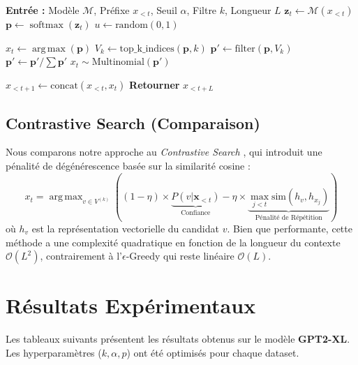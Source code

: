 \documentclass[12pt,a4paper]{article}
\DeclareMathOperator*{\argmax}{arg\,max}
\DeclareMathOperator*{\softmax}{softmax}
\begin{document}
\begin{algorithm}[H]
\caption{Génération $\epsilon$-Greedy}
\begin{algorithmic}[1]
\State \textbf{Entrée :} Modèle $\mathcal{M}$, Préfixe $x_{<t}$, Seuil $\alpha$, Filtre $k$, Longueur $L$
    \State $\mathbf{z}_t \leftarrow \mathcal{M}(x_{<t})$ 
    \State $\mathbf{p} \leftarrow \softmax(\mathbf{z}_t)$
    \State $u \leftarrow \text{random}(0, 1)$
    
     
        \State $x_t \leftarrow \argmax(\mathbf{p})$
    \Else {}
        \State $V_k \leftarrow \text{top\_k\_indices}(\mathbf{p}, k)$
        \State $\mathbf{p}' \leftarrow \text{filter}(\mathbf{p}, V_k)$ 
        \State $\mathbf{p}' \leftarrow \mathbf{p}' / \sum \mathbf{p}'$ 
        \State $x_t \sim \text{Multinomial}(\mathbf{p}')$
    \EndIf
    
    \State $x_{<t+1} \leftarrow \text{concat}(x_{<t}, x_t)$
\EndFor
\State \textbf{Retourner} $x_{<t+L}$
\end{algorithmic}
\end{algorithm}

\subsection{Contrastive Search (Comparaison)}
Nous comparons notre approche au \textit{Contrastive Search} \cite{su2022contrastive}, qui introduit une pénalité de dégénérescence basée sur la similarité cosine :
\begin{equation}
    x_t = \argmax_{v \in V^{(k)}} \left( (1 - \eta) \times \underbrace{P(v | \mathbf{x}_{<t})}_{\text{Confiance}} - \eta \times \underbrace{\max_{j < t} \text{sim}(h_v, h_{x_j})}_{\text{Pénalité de Répétition}} \right)
\end{equation}
où $h_v$ est la représentation vectorielle du candidat $v$. Bien que performante, cette méthode a une complexité quadratique en fonction de la longueur du contexte $\mathcal{O}(L^2)$, contrairement à l'$\epsilon$-Greedy qui reste linéaire $\mathcal{O}(L)$.

\section{R\'esultats Exp\'erimentaux}

Les tableaux suivants pr\'esentent les r\'esultats obtenus sur le mod\`ele \textbf{GPT2-XL}. Les hyperparam\`etres ($k, \alpha, p$) ont \'et\'e optimis\'es pour chaque dataset.
\end{document}
